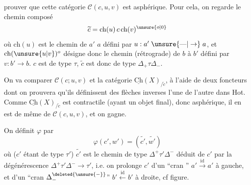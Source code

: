 prouver que cette catégorie $\mathcal C(c,u,v)$ est asphérique. Pour cela, on regarde le chemin composé
\[
\widetilde c=\mathrm{ch}(u)\,c\,\mathrm{ch}(v)^{\unsure{o|0}}
\]
où $\mathrm{ch}(u)$ est le chemin  de $a'$  $a$ défini par $u:a'\mathrel{\unsure{\text{---}|\to}}a$, et $\mathrm{ch}(\unsure{u|v})^o$ désigne donc le chemin (rétrograde) de $b$ à $b'$ défini par $v:b'\to b$.  $c$ est de type $\tau$, $\widetilde c$ est donc de type $\Delta_+\tau\Delta_-$.

On va comparer $\mathcal C(c;u,v)$ et la catégorie $\underline{\mathrm{Ch}}(X)_{/\widetilde c}$, à l'aide de deux foncteurs
dont on prouvera qu'ils définissent des flèches inverses l'une de l'autre dans Hot. Comme $\underline{\mathrm{Ch}}(X)_{/\widetilde c}$ est contractile (ayant un objet final), donc asphérique, il en est de même de $\mathcal C(c,u,v)$, et on gagne.

On définit $\varphi$ par
\[
\boxed{\varphi(c',w')=(\widetilde{c'},\widetilde{w'})}
\]
où ($c'$ étant de type $\tau'$) $\widetilde{c'}$ est le chemin de type $\Delta^+\tau'\Delta^-$ déduit de \deleted{$\unsure{\varphi}$} $c'$  par la dégénérescence $\Delta^+\tau'\Delta^-\to\tau'$, i.e. on prolonge $c'$ d'un ``cran \inserted{$\Delta_+^{\deleted{\unsure{+}}}$}'' $a'\xrightarrow{\mathrm{id}}a'$ à gauche, et d'un ``cran $\Delta_-^{\deleted{\unsure{-}}}$'' $b'\xleftarrow{\mathrm{id}}b'$ à droite, cf figure.
